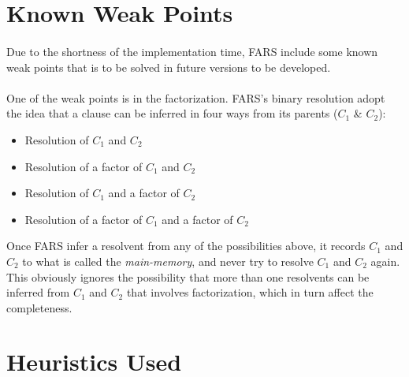 \documentclass[11pt]{report}
\begin{document}
\section{Known Weak Points}                                                                                                                                                                                                                                                                                                                                                                                                                                                                                                                                                                                   
\label{section:weak}

\paragraph{} Due to the shortness of the implementation time, FARS include some known weak points that is to be solved in future versions to be developed. 

\paragraph{} One of the weak points is in the factorization. FARS's binary resolution adopt the idea that a clause can be inferred in four ways from its parents ($C_1$ \& $C_2$):

\begin{itemize}
 \item Resolution of $C_1$ and $C_2$
 \item Resolution of a factor of $C_1$ and $C_2$
 \item Resolution of $C_1$ and a factor of $C_2$
 \item Resolution of a factor of $C_1$ and a factor of $C_2$
\end{itemize}

Once FARS infer a resolvent from any of the possibilities above, it records $C_1$ and $C_2$ to what is called the \emph{main-memory}, and never try to resolve $C_1$ and $C_2$ again. This obviously ignores the possibility that more than one resolvents can be inferred from $C_1$ and $C_2$ that involves factorization, which in turn affect the completeness.

\section{Heuristics Used}
\end{document}
